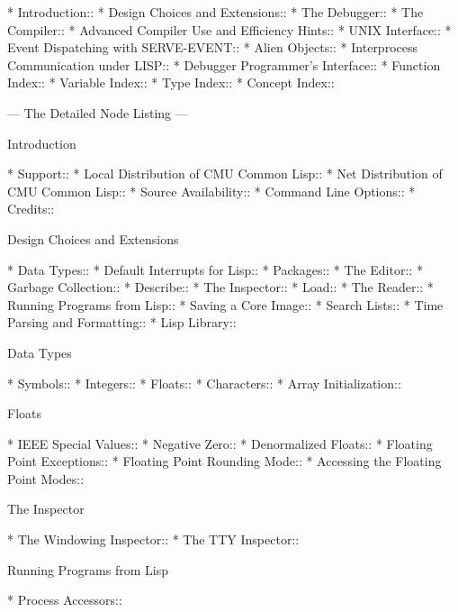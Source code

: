 


\begin{menu}
* Introduction::                
* Design Choices and Extensions::  
* The Debugger::                
* The Compiler::                
* Advanced Compiler Use and Efficiency Hints::  
* UNIX Interface::              
* Event Dispatching with SERVE-EVENT::  
* Alien Objects::               
* Interprocess Communication under LISP::  
* Debugger Programmer's Interface::  
* Function Index::              
* Variable Index::              
* Type Index::                  
* Concept Index::               

 --- The Detailed Node Listing ---

Introduction

* Support::                     
* Local Distribution of CMU Common Lisp::  
* Net Distribution of CMU Common Lisp::  
* Source Availability::         
* Command Line Options::        
* Credits::                     

Design Choices and Extensions

* Data Types::                  
* Default Interrupts for Lisp::  
* Packages::                    
* The Editor::                  
* Garbage Collection::          
* Describe::                    
* The Inspector::               
* Load::                        
* The Reader::                  
* Running Programs from Lisp::  
* Saving a Core Image::         
* Search Lists::                
* Time Parsing and Formatting::  
* Lisp Library::                

Data Types

* Symbols::                     
* Integers::                    
* Floats::                      
* Characters::                  
* Array Initialization::        

Floats

* IEEE Special Values::         
* Negative Zero::               
* Denormalized Floats::         
* Floating Point Exceptions::   
* Floating Point Rounding Mode::  
* Accessing the Floating Point Modes::  

The Inspector

* The Windowing Inspector::     
* The TTY Inspector::           

Running Programs from Lisp

* Process Accessors::           


\end{menu}
